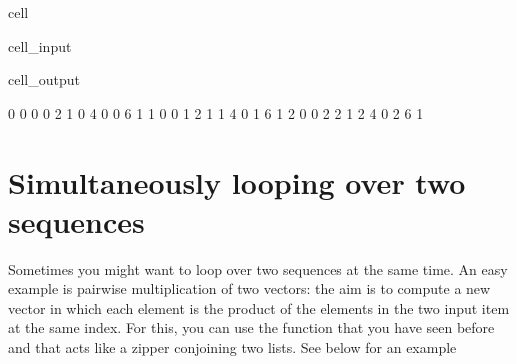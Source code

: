 \documentclass[letterpaper,10pt,english]{jupyterBook}
\begin{document}
\begin{sphinxuseclass}{cell}\begin{sphinxVerbatimInput}

\begin{sphinxuseclass}{cell_input}
\begin{sphinxVerbatim}[commandchars=\\\{\}]
   
      
       
           
              
                
\end{sphinxVerbatim}

\end{sphinxuseclass}\end{sphinxVerbatimInput}
\begin{sphinxVerbatimOutput}

\begin{sphinxuseclass}{cell_output}
\begin{sphinxVerbatim}[commandchars=\\\{\}]
0 0 0
0 2 1
0 4 0
0 6 1
1 0 0
1 2 1
1 4 0
1 6 1
2 0 0
2 2 1
2 4 0
2 6 1
\end{sphinxVerbatim}

\end{sphinxuseclass}\end{sphinxVerbatimOutput}

\end{sphinxuseclass}

\section{Simultaneously looping over two sequences}
\label{\detokenize{notebooks/03_ControlStructures/03_ControlStructures_student:simultaneously-looping-over-two-sequences}}
\sphinxAtStartPar
Sometimes you might want to loop over two sequences at the same time. An easy example is pairwise multiplication of two vectors: the aim is to compute a new vector in which each element is the product of the elements in the two input item at the same index. For this, you can use the  function that you have seen before and that acts like a zipper conjoining two lists. See below for an example
\end{document}
